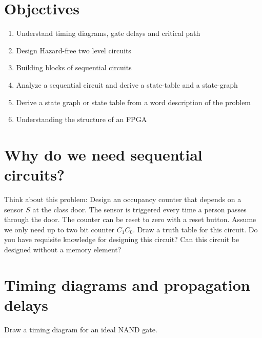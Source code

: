 



\section{Objectives}
\begin{enumerate}
  \item Understand timing diagrams, gate delays and critical path
  \item Design Hazard-free two level circuits
  \item Building blocks of sequential circuits
  \item Analyze a sequential circuit and derive a state-table and a state-graph
  \item Derive a state graph or state table from a word description of the problem
  \item Understanding the structure of an FPGA
\end{enumerate}

\section{Why do we need sequential circuits?}

\begin{example}
  Think about this problem: Design an occupancy counter that depends on a
  sensor $S$ at the class door. The sensor is triggered every time a person passes
  through the door. The counter can be reset to zero with a reset button. Assume
  we only need up to two bit counter $C_1C_0$. Draw a truth table for this
  circuit. Do you have requisite knowledge for designing this circuit? Can this
  circuit be designed without a memory element?
\end{example}
\vspace{10em}


\section{Timing diagrams and propagation delays}

\begin{example}
  Draw a timing diagram for an ideal NAND gate.
\end{example}
\vspace{20em}

